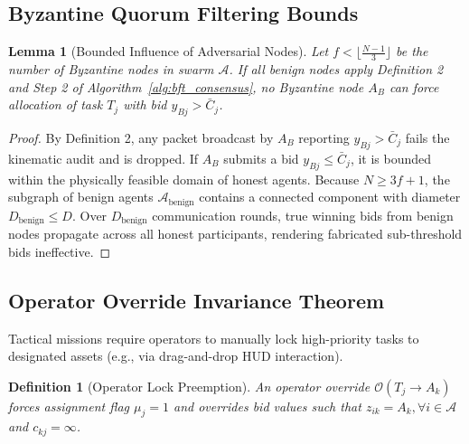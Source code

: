 \documentclass[journal,10pt,twocolumn]{IEEEtran}
\newtheorem{lemma}[theorem]{Lemma}
\newtheorem{definition}{Definition}
\begin{document}
\subsection{Byzantine Quorum Filtering Bounds}
\begin{lemma}[Bounded Influence of Adversarial Nodes]
Let $f < \lfloor \frac{N-1}{3} \rfloor$ be the number of Byzantine nodes in swarm $\mathcal{A}$. If all benign nodes apply Definition 2 and Step 2 of Algorithm~\ref{alg:bft_consensus}, no Byzantine node $A_B$ can force allocation of task $T_j$ with bid $y_{Bj} > \bar{C}_j$.
\end{lemma}
\begin{proof}
By Definition 2, any packet broadcast by $A_B$ reporting $y_{Bj} > \bar{C}_j$ fails the kinematic audit and is dropped. If $A_B$ submits a bid $y_{Bj} \le \bar{C}_j$, it is bounded within the physically feasible domain of honest agents. Because $N \ge 3f + 1$, the subgraph of benign agents $\mathcal{A}_{\text{benign}}$ contains a connected component with diameter $D_{\text{benign}} \le D$. Over $D_{\text{benign}}$ communication rounds, true winning bids from benign nodes propagate across all honest participants, rendering fabricated sub-threshold bids ineffective.
\end{proof}

\subsection{Operator Override Invariance Theorem}
Tactical missions require operators to manually lock high-priority tasks to designated assets (e.g., via drag-and-drop HUD interaction).

\begin{definition}[Operator Lock Preemption]
An operator override $\mathcal{O}(T_j \to A_k)$ forces assignment flag $\mu_j = 1$ and overrides bid values such that $z_{ik} = A_k, \forall i \in \mathcal{A}$ and $c_{kj} = \infty$.
\end{definition}
\end{document}
